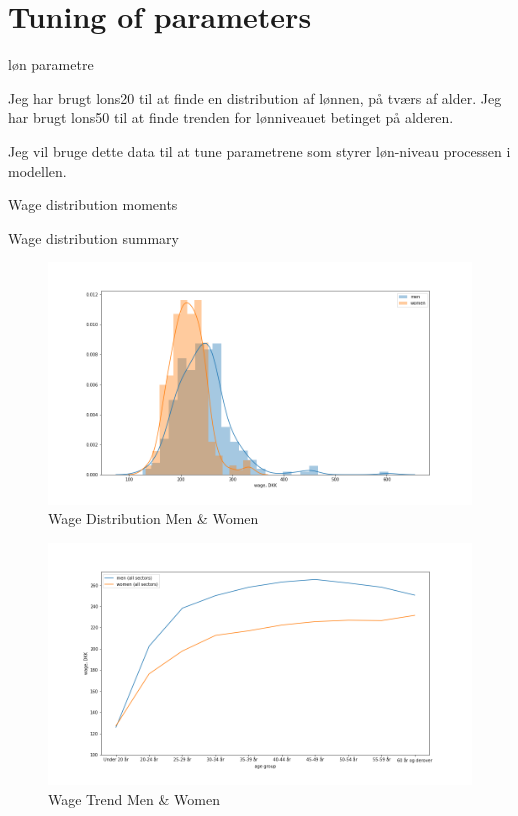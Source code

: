 \section{Tuning of parameters}

løn parametre

Jeg har brugt lons20 til at finde en distribution af lønnen, på tværs af alder.
Jeg har brugt lons50 til at finde trenden for lønniveauet betinget på alderen.

Jeg vil bruge dette data til at tune parametrene som styrer løn-niveau processen i modellen.

\iffalse
\begin{table}[ht]
    \centering
    
    \caption{Wage distribution moments}
    \label{tab:my_label}
\end{table}


\begin{table}[ht]
    \centering
    
    \caption{Wage distribution summary}
    \label{tab:my_label}
\end{table}

\begin{figure}
    \centering
    \includegraphics[scale=0.4]{figures/wage_distribution_lons20.png}
    \caption{Wage Distribution Men \& Women}
    \label{fig:my_label}
\end{figure}


\begin{figure}
    \centering
    \includegraphics[scale=0.4]{figures/wage_trend_lons50.png}
    \caption{Wage Trend Men \& Women}
    \label{fig:my_label}
\end{figure}

